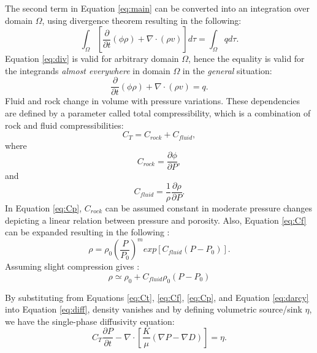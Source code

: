 The second term in Equation \ref{eq:main} can be converted into an integration
over domain $\Omega$, using divergence theorem resulting in the following:
\begin{equation}
  \int_{\Omega}[\frac{\partial}{\partial t}(\phi\rho)+\nabla \cdot (\rho
v)]d\tau=\int_{\Omega}qd\tau.
  \label{eq:div}
\end{equation} Equation \ref{eq:div} is valid for arbitrary domain $\Omega$,
hence the equality is valid for the integrands \textit{almost everywhere} in
domain $\Omega$ in the \textit{general} situation:
\begin{equation}
 \frac{\partial}{\partial t}(\phi\rho)+\nabla \cdot (\rho v)=q.
 \label{eq:diff}
\end{equation}
Fluid and rock change in volume with pressure variations. These dependencies are
defined by a parameter called total compressibility, which is a combination of
rock and fluid compressibilities:
\begin{equation}
  C_{T}=C_{rock}+C_{fluid},
  \label{eq:Ct}
\end{equation} where
\begin{equation}
  C_{rock}=\frac{\partial \phi}{\partial P},
  \label{eq:Cp}
\end{equation} and
\begin{equation}
  C_{fluid}=\frac{1}{\rho} \frac{\partial \rho}{\partial P}.
  \label{eq:Cf}
\end{equation} In Equation \ref{eq:Cp}, $C_{rock}$ can be assumed constant in
moderate pressure changes depicting a linear relation between pressure and
porosity. Also, Equation \ref{eq:Cf} can be expanded resulting in the following
\cite{muskatflow}:
\begin{equation}
 \rho=\rho_0 (\frac{P}{P_0})^m exp[C_{fluid}(P-P_0)].
 \label{eq:Cexp}
\end{equation} Assuming slight compression gives \cite{sahimi2011flow}:
\begin{equation}
 \rho \simeq \rho_0 + C_{fluid} \rho_0 (P-P_0)
 \label{eq:Cslg}
\end{equation}

By substituting from Equations \ref{eq:Ct}, \ref{eq:Cf}, \ref{eq:Cp}, and
Equation \ref{eq:darcy} into Equation \ref{eq:diff}, density vanishes and by
defining volumetric source/sink $\eta$, we have the single-phase diffusivity
equation:
\begin{equation}
 C_T \frac{\partial P}{\partial t}-\nabla \cdot [\frac{K}{\mu} (\nabla P -
\nabla D)] = \eta.
 \label{eq:vol}
\end{equation}

